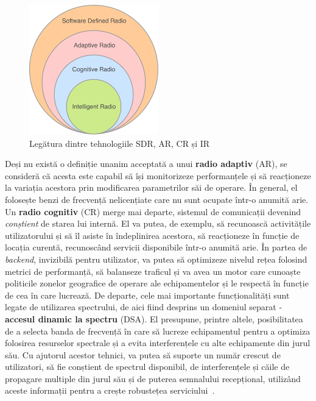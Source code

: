 \begin{figure}[h]
    \centering
    \includegraphics[width=0.5\textwidth]{src/img/sdr-circles}
    \caption{Legătura dintre tehnologiile SDR, AR, CR și IR}
    \label{fig:sdr-circles}
\end{figure}

Deși nu există o definiție unanim acceptată a unui \textbf{radio adaptiv} (AR),
se consideră că acesta este capabil să își monitorizeze performanțele și să
reacționeze la variația acestora prin modificarea parametrilor săi de operare.
În general, el folosește benzi de frecvență nelicențiate care nu sunt
ocupate într-o anumită arie.  \\

Un \textbf{radio cognitiv} (CR)  merge mai departe,
sistemul de comunicații devenind \textit{conștient} de starea lui internă. El va
putea, de exemplu, să recunoască activitățile utilizatorului și să îl asiste în
îndeplinirea acestora, să reacționeze în funcție de locația curentă, recunoscând
servicii disponibile într-o anumită arie. În partea de \textit{backend},
invizibilă pentru utilizator, va putea să optimizeze nivelul rețea folosind
metrici de performanță, să balanseze traficul și va avea un motor care cunoaște
politicile zonelor geografice de operare ale echipamentelor și le respectă în
funcție de cea în care lucrează. De departe, cele mai importante funcționalități
sunt legate de utilizarea spectrului, de aici fiind desprins un domeniul separat
- \textbf{accesul dinamic la spectru} (DSA).  El presupune, printre altele, posibilitatea de a selecta banda de
frecvență în care să lucreze echipamentul pentru a optimiza folosirea resurselor spectrale și
a evita interferențele cu alte echipamente din jurul său. Cu ajutorul acestor
tehnici, va putea să suporte un număr crescut de utilizatori, să fie conștient
de spectrul disponibil, de interferențele și căile de propagare multiple din
jurul său și de puterea semnalului recepțional, utilizând aceste informații
pentru a crește robustețea serviciului~\cite{arslan2007cognitive}.  \\

